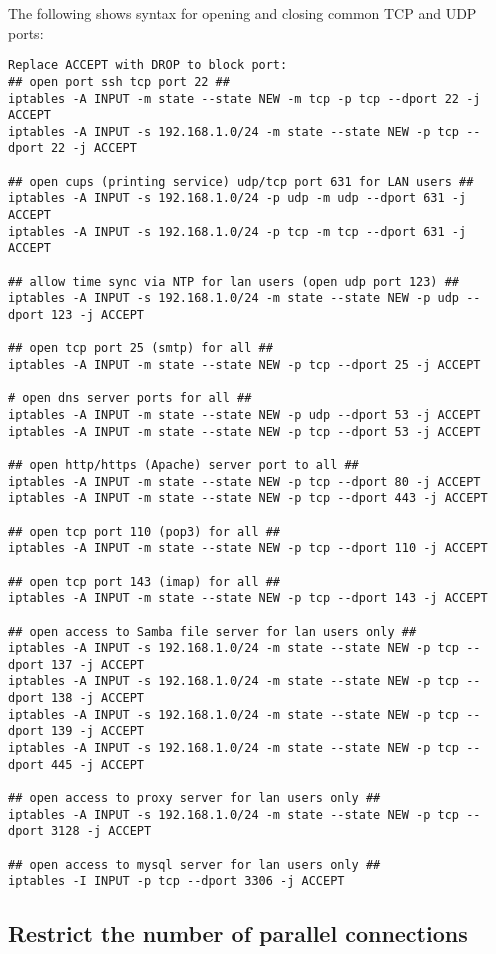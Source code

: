 The following shows syntax for opening and closing common TCP and UDP ports:
 
\begin{verbatim}
Replace ACCEPT with DROP to block port:
## open port ssh tcp port 22 ##
iptables -A INPUT -m state --state NEW -m tcp -p tcp --dport 22 -j ACCEPT
iptables -A INPUT -s 192.168.1.0/24 -m state --state NEW -p tcp --dport 22 -j ACCEPT
 
## open cups (printing service) udp/tcp port 631 for LAN users ##
iptables -A INPUT -s 192.168.1.0/24 -p udp -m udp --dport 631 -j ACCEPT
iptables -A INPUT -s 192.168.1.0/24 -p tcp -m tcp --dport 631 -j ACCEPT
 
## allow time sync via NTP for lan users (open udp port 123) ##
iptables -A INPUT -s 192.168.1.0/24 -m state --state NEW -p udp --dport 123 -j ACCEPT
 
## open tcp port 25 (smtp) for all ##
iptables -A INPUT -m state --state NEW -p tcp --dport 25 -j ACCEPT
 
# open dns server ports for all ##
iptables -A INPUT -m state --state NEW -p udp --dport 53 -j ACCEPT
iptables -A INPUT -m state --state NEW -p tcp --dport 53 -j ACCEPT
 
## open http/https (Apache) server port to all ##
iptables -A INPUT -m state --state NEW -p tcp --dport 80 -j ACCEPT
iptables -A INPUT -m state --state NEW -p tcp --dport 443 -j ACCEPT
 
## open tcp port 110 (pop3) for all ##
iptables -A INPUT -m state --state NEW -p tcp --dport 110 -j ACCEPT
 
## open tcp port 143 (imap) for all ##
iptables -A INPUT -m state --state NEW -p tcp --dport 143 -j ACCEPT
 
## open access to Samba file server for lan users only ##
iptables -A INPUT -s 192.168.1.0/24 -m state --state NEW -p tcp --dport 137 -j ACCEPT
iptables -A INPUT -s 192.168.1.0/24 -m state --state NEW -p tcp --dport 138 -j ACCEPT
iptables -A INPUT -s 192.168.1.0/24 -m state --state NEW -p tcp --dport 139 -j ACCEPT
iptables -A INPUT -s 192.168.1.0/24 -m state --state NEW -p tcp --dport 445 -j ACCEPT
 
## open access to proxy server for lan users only ##
iptables -A INPUT -s 192.168.1.0/24 -m state --state NEW -p tcp --dport 3128 -j ACCEPT
 
## open access to mysql server for lan users only ##
iptables -I INPUT -p tcp --dport 3306 -j ACCEPT
\end{verbatim}

\subsection{Restrict the number of parallel connections}

